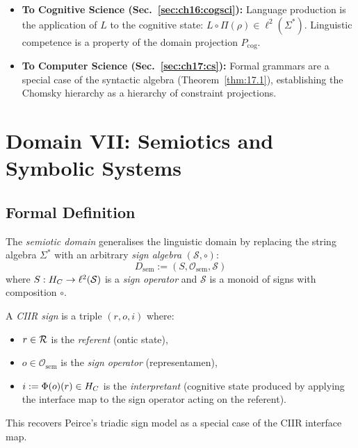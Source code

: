 \begin{itemize}
  \item \textbf{To Cognitive Science (Sec.~\ref{sec:ch16:cogsci}):}
        Language production is the application of $L$ to the cognitive
        state: $L \circ \Pi(\rho) \in \ell^2(\Sigma^*)$.  Linguistic
        competence is a property of the domain projection
        $P_{\mathrm{cog}}$.
  \item \textbf{To Computer Science (Sec.~\ref{sec:ch17:cs}):}
        Formal grammars are a special case of the syntactic algebra
        (Theorem~\ref{thm:17.1}), establishing the Chomsky hierarchy
        as a hierarchy of constraint projections.
\end{itemize}

\section{Domain VII: Semiotics and Symbolic Systems}
\label{sec:ch17:semiotics}

\subsection{Formal Definition}

\begin{definition}\label{def:17.4}
The \emph{semiotic domain} generalises the linguistic domain by
replacing the string algebra $\Sigma^*$ with an arbitrary
\emph{sign algebra} $(\mathcal{S}, \circ)$:
\[
  D_{\mathrm{sem}} := (S, \mathcal{O}_{\mathrm{sem}}, \mathcal{S})
\]
where $S : H_C \to \ell^2(\mathcal{S})$ is a \emph{sign operator}
and $\mathcal{S}$ is a monoid of signs with composition $\circ$.
\end{definition}

\begin{definition}\label{def:17.5}
A \emph{CIIR sign} is a triple $(r, o, i)$ where:
\begin{itemize}
  \item $r \in \mathcal{R}$ is the \emph{referent} (ontic state),
  \item $o \in \mathcal{O}_{\mathrm{sem}}$ is the \emph{sign operator}
        (representamen),
  \item $i := \Phi(o)(r) \in H_C$ is the \emph{interpretant}
        (cognitive state produced by applying the interface map to
        the sign operator acting on the referent).
\end{itemize}
This recovers Peirce's triadic sign model as a special case of the
CIIR interface map.
\end{definition}

